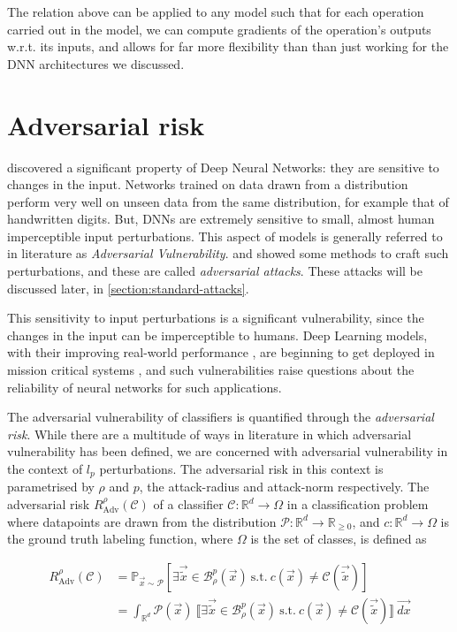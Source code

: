 \documentclass{ociamthesis}
\begin{document}
The relation above can be applied to any model such that for each operation
carried out in the model, we can compute gradients of the operation's outputs
w.r.t. its inputs, and allows for far more flexibility than than just working
for the DNN architectures we discussed.

\section{Adversarial risk}

\citet{42503} discovered a significant property of Deep Neural Networks: they
are sensitive to changes in the input. Networks trained on data drawn from a
distribution perform very well on unseen data from the same distribution, for
example that of handwritten digits. But, DNNs are extremely sensitive to small,
almost human imperceptible input perturbations. This aspect of models is
generally referred to in literature as \emph{Adversarial Vulnerability}.
\citet{Goodfellow2015ExplainingAH} and \citet{madry2019deep} showed some methods
to craft such perturbations, and these are called \emph{adversarial attacks}.
These attacks will be discussed later, in \cref{section:standard-attacks}.

This sensitivity to input perturbations is a significant vulnerability, since
the changes in the input can be imperceptible to humans. Deep Learning models,
with their improving real-world performance
\citep{imagenet,imagenet-superhuman}, are beginning to get deployed in mission
critical systems \citep{adv-vuln-in-mission-critical}, and such vulnerabilities
raise questions about the reliability of neural networks for such applications.

The adversarial vulnerability of classifiers is quantified through the
\emph{adversarial risk}. While there are a multitude of ways in literature in
which adversarial vulnerability has been defined, we are concerned with
adversarial vulnerability in the context of $l_p$ perturbations. The adversarial
risk in this context is parametrised by $\rho$ and $p$, the attack-radius and
attack-norm respectively. The adversarial risk
$R_{\text{Adv}}^{\rho}(\mathcal{C})$ of a classifier $\mathcal{C}: \mathbb{R}^d
\to \Omega$ in a classification problem where datapoints are drawn from the
distribution $\mathcal{P}: \mathbb{R}^d \to \mathbb{R}_{\geq 0}$, and $c:
\mathbb{R}^d \to \Omega$ is the ground truth labeling function, where $\Omega$
is the set of classes, is defined as

\begin{equation} \label{eq:adv-risk}
    \begin{split}
    R_{\text{Adv}}^{\rho}(\mathcal{C}) & = \mathbb{P}_{\vec{x} \sim \mathcal{P}}
    [\exists \vec{\tilde{x}} \in \mathcal{B}_\rho^p(\vec{x})~\text{s.t.}~c(\vec{x}) \neq \mathcal{C}(\vec{\tilde{x}})] \\
    & = \int_{\mathbb{R}^d} \mathcal{P}(\vec{x})
    ~\llbracket \exists \vec{\tilde{x}} \in \mathcal{B}_\rho^p(\vec{x})~\text{s.t.}~c(\vec{x}) \neq \mathcal{C}(\vec{\tilde{x}}) \rrbracket~\vec{dx}
    \end{split}
\end{equation}
\end{document}
